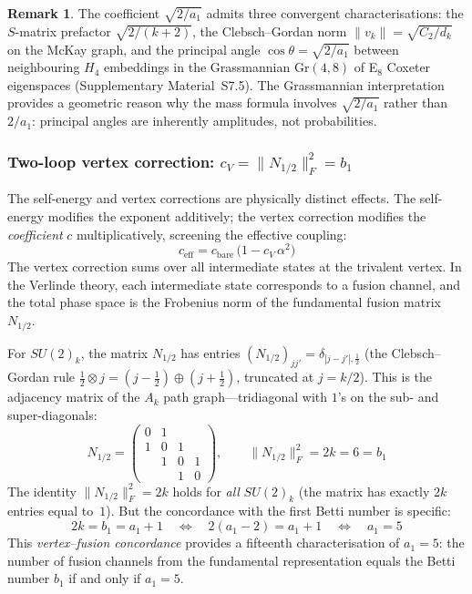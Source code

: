 \documentclass[12pt,a4paper]{article}
\theoremstyle{definition}
\newtheorem{remark}{Remark}
\begin{document}
\begin{remark}
The coefficient $\sqrt{2/a_1}$ admits three convergent characterisations: the $S$-matrix prefactor $\sqrt{2/(k{+}2)}$, the Clebsch--Gordan norm $\|v_k\| = \sqrt{C_2/d_k}$ on the McKay graph, and the principal angle $\cos\theta = \sqrt{2/a_1}$ between neighbouring $H_4$ embeddings in the Grassmannian $\mathrm{Gr}(4,8)$ of E$_8$ Coxeter eigenspaces (Supplementary Material~S7.5).  The Grassmannian interpretation provides a geometric reason why the mass formula involves $\sqrt{2/a_1}$ rather than $2/a_1$: principal angles are inherently amplitudes, not probabilities.
\end{remark}

\subsubsection*{Two-loop vertex correction: $c_V = \|N_{1/2}\|_F^2 = b_1$}

The self-energy and vertex corrections are physically distinct effects.  The self-energy modifies the exponent additively; the vertex correction modifies the \emph{coefficient} $c$ multiplicatively, screening the effective coupling:
\begin{equation}
c_{\mathrm{eff}} = c_{\mathrm{bare}} \,\bigl(1 - c_V\,\alpha^2\bigr)
\label{eq:vertex}
\end{equation}
The vertex correction sums over all intermediate states at the trivalent vertex.  In the Verlinde theory, each intermediate state corresponds to a fusion channel, and the total phase space is the Frobenius norm of the fundamental fusion matrix $N_{1/2}$.

For $SU(2)_k$, the matrix $N_{1/2}$ has entries $(N_{1/2})_{jj'} = \delta_{|j-j'|,\frac{1}{2}}$ (the Clebsch--Gordan rule $\tfrac{1}{2} \otimes j = (j{-}\tfrac{1}{2}) \oplus (j{+}\tfrac{1}{2})$, truncated at $j = k/2$).  This is the adjacency matrix of the $A_k$ path graph---tridiagonal with $1$'s on the sub- and super-diagonals:
\begin{equation}
N_{1/2} = \begin{pmatrix} 0 & 1 & & \\ 1 & 0 & 1 & \\ & 1 & 0 & 1 \\ & & 1 & 0 \end{pmatrix}, \qquad
\|N_{1/2}\|_F^2 = 2k = 6 = b_1
\label{eq:frobenius}
\end{equation}
The identity $\|N_{1/2}\|_F^2 = 2k$ holds for \emph{all} $SU(2)_k$ (the matrix has exactly $2k$ entries equal to~$1$).  But the concordance with the first Betti number is specific:
\begin{equation}
2k = b_1 = a_1 + 1 \quad\Longleftrightarrow\quad 2(a_1 - 2) = a_1 + 1 \quad\Longleftrightarrow\quad a_1 = 5
\label{eq:vertex_char}
\end{equation}
This \emph{vertex--fusion concordance} provides a fifteenth characterisation of $a_1 = 5$: the number of fusion channels from the fundamental representation equals the Betti number $b_1$ if and only if $a_1 = 5$.
\end{document}
